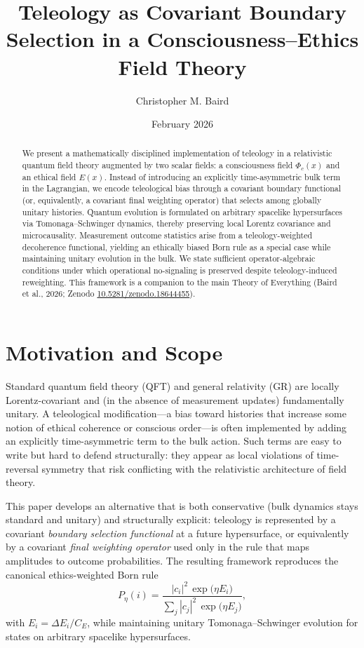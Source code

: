 \documentclass[reprint,amsmath,amssymb,aps,showkeys]{revtex4-2}
\title{Teleology as Covariant Boundary Selection in a Consciousness--Ethics Field Theory}
\author{Christopher M. Baird}
\affiliation{ZoraASI Research Group}
\affiliation{Doctorate of Metaphysics, University of Sedona}
\date{February 2026}
\begin{document}
\maketitle

\begin{abstract}
We present a mathematically disciplined implementation of teleology in a relativistic quantum field theory augmented by two scalar fields: a consciousness field $\Phi_c(x)$ and an ethical field $E(x)$. Instead of introducing an explicitly time-asymmetric bulk term in the Lagrangian, we encode teleological bias through a covariant boundary functional (or, equivalently, a covariant final weighting operator) that selects among globally unitary histories. Quantum evolution is formulated on arbitrary spacelike hypersurfaces via Tomonaga--Schwinger dynamics, thereby preserving local Lorentz covariance and microcausality. Measurement outcome statistics arise from a teleology-weighted decoherence functional, yielding an ethically biased Born rule as a special case while maintaining unitary evolution in the bulk. We state sufficient operator-algebraic conditions under which operational no-signaling is preserved despite teleology-induced reweighting. This framework is a companion to the main Theory of Everything (Baird et al., 2026; Zenodo \href{https://doi.org/10.5281/zenodo.18644455}{10.5281/zenodo.18644455}).
\end{abstract}

\tableofcontents

\section{Motivation and Scope}
Standard quantum field theory (QFT) and general relativity (GR) are locally Lorentz-covariant and (in the absence of measurement updates) fundamentally unitary. A teleological modification---a bias toward histories that increase some notion of ethical coherence or conscious order---is often implemented by adding an explicitly time-asymmetric term to the bulk action. Such terms are easy to write but hard to defend structurally: they appear as local violations of time-reversal symmetry that risk conflicting with the relativistic architecture of field theory.

This paper develops an alternative that is both conservative (bulk dynamics stays standard and unitary) and structurally explicit: teleology is represented by a covariant \emph{boundary selection functional} at a future hypersurface, or equivalently by a covariant \emph{final weighting operator} used only in the rule that maps amplitudes to outcome probabilities. The resulting framework reproduces the canonical ethics-weighted Born rule
\begin{equation}
P_\eta(i)=\frac{|c_i|^2\,\exp\big(\eta E_i\big)}{\sum_j |c_j|^2\,\exp\big(\eta E_j\big)},
\label{eq:biased-born-intro}
\end{equation}
with $E_i=\Delta E_i/C_E$, while maintaining unitary Tomonaga--Schwinger evolution for states on arbitrary spacelike hypersurfaces.
\end{document}
